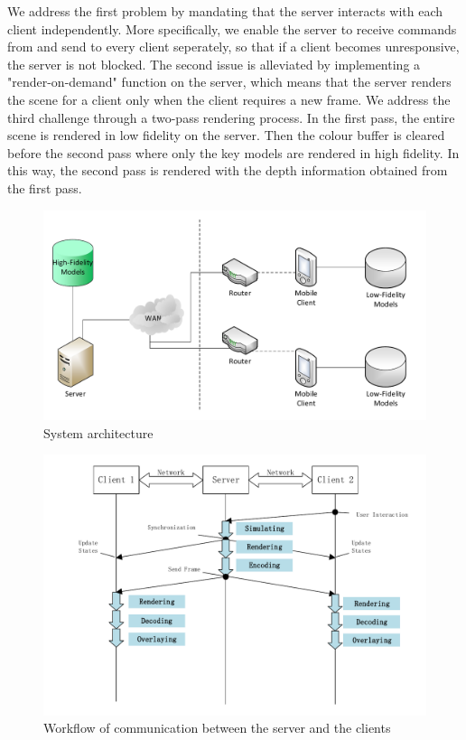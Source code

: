 We address the first problem by mandating that the server interacts with each client independently. More specifically, we enable the server to receive commands from and send to every client seperately, so that if a client becomes unresponsive, the server is not blocked.
The second issue is alleviated by implementing a "render-on-demand" function on the server, which means that the server renders the scene for a client only when the client requires a new frame.
We address the third challenge through a two-pass rendering process. In the first pass, the entire scene is rendered in low fidelity on the server. Then the colour buffer is cleared before the second pass where only the key models are rendered in high fidelity. In this way, the second pass is rendered with the depth information obtained from the first pass.

\begin{figure}[!htbp]
	\includegraphics[width=\textwidth]{figures/architecture.pdf}
	\caption{System architecture}
	\label{fig:architecture}
\end{figure}

\begin{figure}[!htbp]
	\includegraphics[width=\textwidth]{figures/sequence_workflow.pdf}
	\caption{Workflow of communication between the server and the clients}
	\label{fig:swf}
\end{figure}

